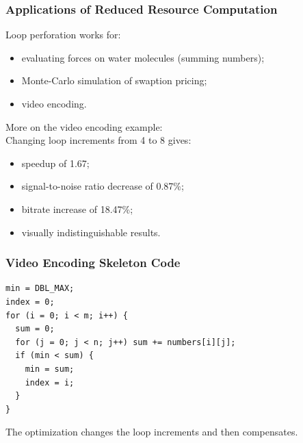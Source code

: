 \begin{frame}
  \frametitle{Applications of Reduced Resource Computation}


  Loop perforation works for:
  \begin{itemize}
   \item evaluating forces on water molecules (summing numbers);
   \item Monte-Carlo simulation of swaption pricing;
   \item video encoding.
  \end{itemize}

  More on the video encoding example:\\
  Changing loop increments from 4 to 8 gives:
\begin{itemize}
 \item speedup of 1.67;
 \item signal-to-noise ratio decrease of 0.87\%;
 \item bitrate increase of 18.47\%;
 \item visually indistinguishable results.
\end{itemize}

\end{frame}


\begin{frame}[fragile]
  \frametitle{Video Encoding Skeleton Code}


\begin{lstlisting}
min = DBL_MAX;
index = 0;
for (i = 0; i < m; i++) {
  sum = 0;
  for (j = 0; j < n; j++) sum += numbers[i][j];
  if (min < sum) {
    min = sum;
    index = i;
  }
}
\end{lstlisting}
The optimization changes the loop increments and then compensates. 

\end{frame}





